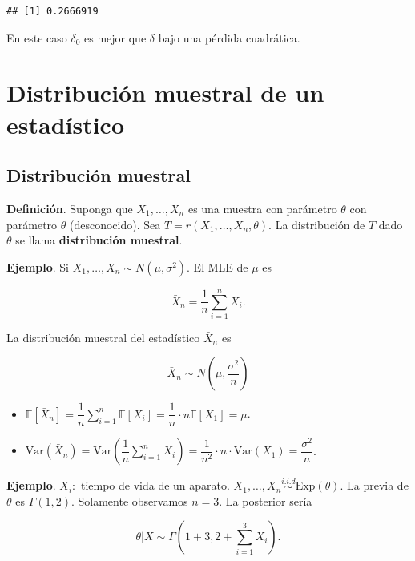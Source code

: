 \documentclass[
  12pt,
]{book}
\begin{document}
\begin{verbatim}
## [1] 0.2666919
\end{verbatim}

En este caso \(\delta_0\) es mejor que \(\delta\) bajo una pérdida cuadrática.

\hypertarget{distribuciuxf3n-muestral-de-un-estaduxedstico}{%
\chapter{Distribución muestral de un estadístico}\label{distribuciuxf3n-muestral-de-un-estaduxedstico}}

\hypertarget{distribuciuxf3n-muestral}{%
\section{Distribución muestral}\label{distribuciuxf3n-muestral}}

\textbf{Definición}. Suponga que \(X_1,\dots,X_n\) es una muestra con parámetro
\(\theta\) con parámetro \(\theta\) (desconocido). Sea \(T=r(X_1,\dots,X_n,\theta)\). La
distribución de \(T\) dado \(\theta\) se llama \textbf{distribución muestral}.

\textbf{Ejemplo}. Si \(X_1,\dots,X_n \sim N(\mu,\sigma^2)\). El MLE de \(\mu\) es

\begin{equation*}
\bar X_n =\dfrac 1n \sum_{i=1}^n X_i.
\end{equation*}

La distribución muestral del estadístico \(\bar X_n\) es

\[
\bar X_n \sim N\left(\mu, \dfrac{\sigma^2}n \right)
\]

\begin{itemize}
\item
  \(\mathbb E[\bar X_n] = \dfrac 1n\displaystyle\sum_{i=1}^n\mathbb E[X_i] = \dfrac 1n\cdot n \mathbb E[X_1] = \mu\).
\item
  \(\text{Var}(\bar X_n) = \text{Var}\left(\dfrac 1n \displaystyle\sum_{i=1}^n X_i\right) = \dfrac{1}{n^2}\cdot n\cdot \text{Var}(X_1) = \dfrac{\sigma^2}n\).
\end{itemize}

\textbf{Ejemplo}. \(X_i:\) tiempo de vida de un aparato. \(X_1,\dots,X_n \stackrel{i.i.d}{\sim} \text{Exp}(\theta)\). La previa de \(\theta\) es \(\Gamma(1,2)\). Solamente
observamos \(n=3\). La posterior sería

\[
\theta|X \sim \Gamma(1+3,2+\sum_{i=1}^3 X_i). 
\]
\end{document}

